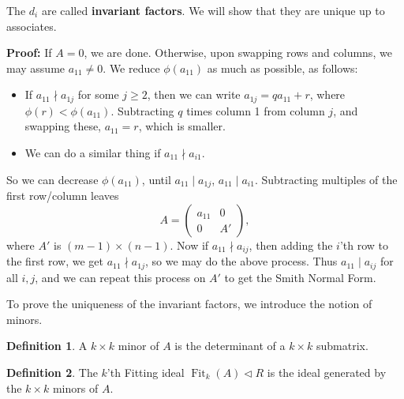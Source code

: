 \documentclass[12pt]{article}
\DeclareMathOperator{\Fit}{Fit}
\theoremstyle{definition}
\newtheorem{definition}{Definition}[section]
\theoremstyle{remark}
\begin{document}
The $d_i$ are called \textbf{invariant factors}. We will show that they are unique up to associates.

\begin{adjustbox}{minipage = \columnwidth - 25.5pt, margin=1em, frame=1pt, margin=0em}
	\textbf{Proof:} If $A = 0$, we are done. Otherwise, upon swapping rows and columns, we may assume $a_{11} \neq 0$. We reduce $\phi(a_{11})$ as much as possible, as follows:
	\begin{itemize}
		\item If $a_{11} \nmid a_{1j}$ for some $j \geq2$, then we can write $a_{1j} = q a_{11} + r$, where $\phi(r) < \phi(a_{11})$. Subtracting $q$ times column 1 from column $j$, and swapping these, $a_{11} = r$, which is smaller.
		\item We can do a similar thing if $a_{11} \nmid a_{i1}$.
	\end{itemize}
	So we can decrease $\phi(a_{11})$, until $a_{11} \mid a_{1j}$, $a_{11} \mid a_{i1}$. Subtracting multiples of the first row/column leaves
	\[
	A =
	\begin{pmatrix}
		a_{11} & 0 \\
		0 & A'
	\end{pmatrix}
	,\]
	where $A'$ is $(m-1) \times (n-1)$. Now if $a_{11} \nmid a_{ij}$, then adding the $i$'th row to the first row, we get $a_{11} \nmid a_{1j}$, so we may do the above process. Thus $a_{11} \mid a_{ij}$ for all $i, j$, and we can repeat this process on $A'$ to get the Smith Normal Form.
\end{adjustbox}

To prove the uniqueness of the invariant factors, we introduce the notion of minors.

\begin{definition}
	A $k \times k$ minor of $A$ is the determinant of a $k \times k$ submatrix.
\end{definition}

\begin{definition}
	The $k$'th Fitting ideal $\Fit_k(A) \lhd R$ is the ideal generated by the $k \times k$ minors of $A$.
\end{definition}
\end{document}
